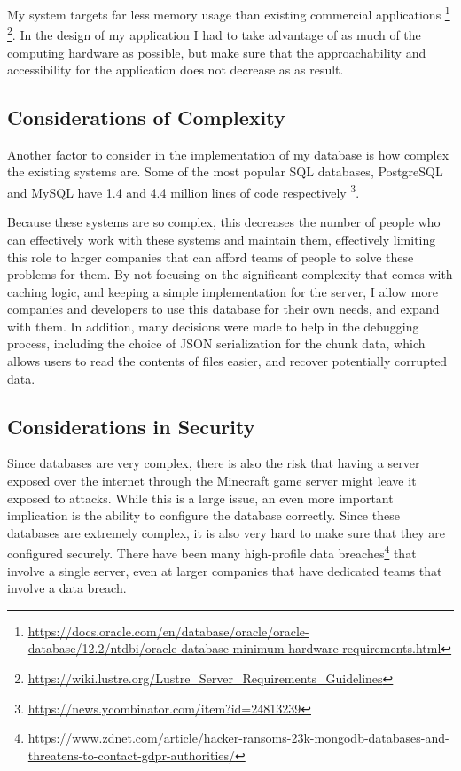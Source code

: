 \documentclass[10pt,twocolumn]{article}
\begin{document}
My system targets far less memory usage than existing commercial applications
\footnote{\url{https://docs.oracle.com/en/database/oracle/oracle-database/12.2/ntdbi/oracle-database-minimum-hardware-requirements.html}}
\footnote{\url{https://wiki.lustre.org/Lustre_Server_Requirements_Guidelines}}.
In the design of my application I had to take advantage of as much of the
computing hardware as possible, but make sure that the approachability and
accessibility for the application does not decrease as as result.


\subsection{Considerations of Complexity}
Another factor to consider in the implementation of my database is how complex
the existing systems are. Some of the most popular SQL databases, PostgreSQL and
MySQL have 1.4 and 4.4 million lines of code respectively
\footnote{\url{https://news.ycombinator.com/item?id=24813239}}.

Because these systems are so complex, this decreases the number of people who
can effectively work with these systems and maintain them, effectively limiting
this role to larger companies that can afford teams of people to solve these
problems for them. By not focusing on the significant complexity that comes with
caching logic, and keeping a simple implementation for the server, I allow more
companies and developers to use this database for their own needs, and expand
with them. In addition, many decisions were made to help in the debugging
process, including the choice of JSON serialization for the chunk data, which
allows users to read the contents of files easier, and recover potentially
corrupted data.

\subsection{Considerations in Security}

Since databases are very complex, there is also the risk that having a
server exposed over the internet through the Minecraft game server might leave
it exposed to attacks. While this is a large issue, an even more important
implication is the ability to configure the database correctly. Since these
databases are extremely complex, it is also very hard to make sure that they are
configured securely. There have been many high-profile data
breaches\footnote{\url{https://www.zdnet.com/article/hacker-ransoms-23k-mongodb-databases-and-threatens-to-contact-gdpr-authorities/}}
that involve a single server, even at larger companies that have dedicated teams
that involve a data breach.
\end{document}
